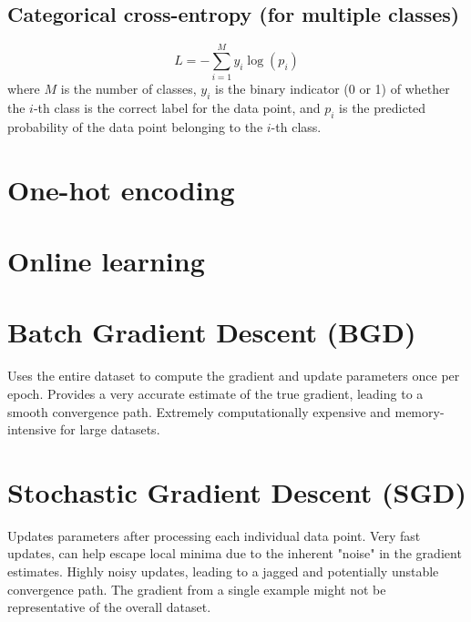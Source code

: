 \subsection{Categorical cross-entropy (for multiple classes)}
\begin{equation}
  L = -\sum_{i=1}^M y_i\log(p_i)
\end{equation}
where $M$ is the number of classes, $y_i$ is the binary indicator (0 or 1) of whether the $i$-th class is the correct label for the data point, and $p_i$ is the predicted probability of the data point belonging to the $i$-th class.

\section{One-hot encoding}

\section{Online learning}

\section{Batch Gradient Descent (BGD)}
Uses the entire dataset to compute the gradient and update parameters
once per epoch. Provides a very accurate estimate of the true
gradient, leading to a smooth convergence path. Extremely
computationally expensive and memory-intensive for large datasets.

\section{Stochastic Gradient Descent (SGD)}
Updates parameters after processing each individual data point. Very
fast updates, can help escape local minima due to the inherent "noise"
in the gradient estimates. Highly noisy updates, leading to a jagged
and potentially unstable convergence path. The gradient from a single
example might not be representative of the overall dataset.

